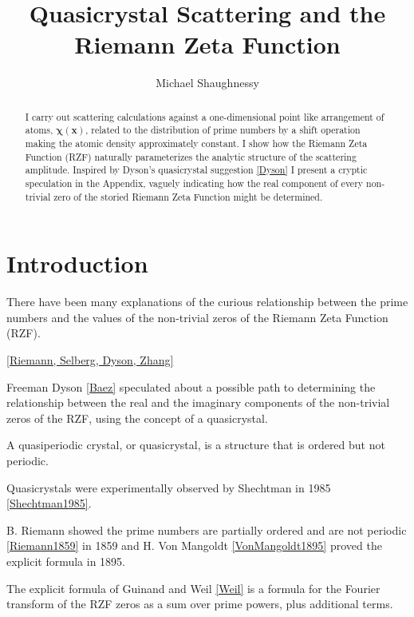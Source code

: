 \documentclass[11pt, oneside]{article}   	%
\title{Quasicrystal Scattering and the Riemann Zeta Function}
\author{Michael Shaughnessy}
\begin{document}
\maketitle

\begin{abstract}
I carry out scattering calculations against a one-dimensional point like arrangement of atoms, $\mathbf{\chi(x)}$, related to the distribution of prime numbers by a shift operation making the atomic density approximately constant. 
I show how the Riemann Zeta Function (RZF) naturally parameterizes the analytic structure of the scattering amplitude. 
Inspired by Dyson's quasicrystal suggestion \ref{Dyson} I present a cryptic speculation in the Appendix, vaguely indicating how the real component of every non-trivial zero of the storied Riemann Zeta Function might be determined.
\end{abstract}

\section{Introduction}

There have been many explanations of the curious relationship between the prime numbers and the values of the non-trivial zeros of the Riemann Zeta Function (RZF).

\ref{Riemann, Selberg, Dyson, Zhang}

Freeman Dyson \ref{Baez} speculated about a possible path to determining the relationship between the real and the imaginary components of the non-trivial zeros of the RZF, using the concept of a quasicrystal.

A quasiperiodic crystal, or quasicrystal, is a structure that is ordered but not periodic.

Quasicrystals were experimentally observed by Shechtman in 1985 \ref{Shechtman1985}. 

B. Riemann showed the prime numbers are partially ordered and are not periodic \ref{Riemann1859} in 1859 and H. Von Mangoldt \ref{VonMangoldt1895} proved the explicit formula in 1895.

The explicit formula of Guinand and Weil \ref{Weil} is a formula for the Fourier transform of the RZF zeros as a sum over prime powers, plus additional terms.  


\end{document}
